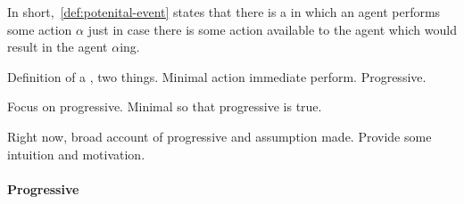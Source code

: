 \begin{note}
  In short,~\autoref{def:potenital-event} states that there is a \pevent{} in which an agent performs some action \(\alpha\) just in case there is some action available to the agent which would result in the agent \(\alpha\)ing.
\end{note}

\begin{note}
  Definition of a \pevent{}, two things.
  Minimal action immediate perform.
  Progressive.

  Focus on progressive.
  Minimal so that progressive is true.

  Right now, broad account of progressive and assumption made.
  Provide some intuition and motivation.
\end{note}

\paragraph{Progressive}

